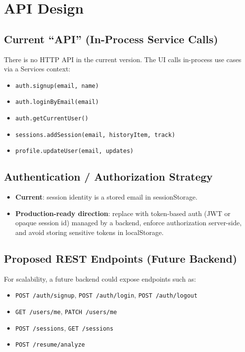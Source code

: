 \documentclass[11pt]{article}
\begin{document}
\section{API Design}

\subsection{Current ``API'' (In-Process Service Calls)}
There is no HTTP API in the current version. The UI calls in-process use cases via a Services context:
\begin{itemize}[leftmargin=1.2em]
  \item \texttt{auth.signup(email, name)}
  \item \texttt{auth.loginByEmail(email)}
  \item \texttt{auth.getCurrentUser()}
  \item \texttt{sessions.addSession(email, historyItem, track)}
  \item \texttt{profile.updateUser(email, updates)}
\end{itemize}

\subsection{Authentication / Authorization Strategy}
\begin{itemize}[leftmargin=1.2em]
  \item \textbf{Current}: session identity is a stored email in sessionStorage.
  \item \textbf{Production-ready direction}: replace with token-based auth (JWT or opaque session id) managed by a backend, enforce authorization server-side, and avoid storing sensitive tokens in localStorage.
\end{itemize}

\subsection{Proposed REST Endpoints (Future Backend)}
For scalability, a future backend could expose endpoints such as:
\begin{itemize}[leftmargin=1.2em]
  \item \texttt{POST /auth/signup}, \texttt{POST /auth/login}, \texttt{POST /auth/logout}
  \item \texttt{GET /users/me}, \texttt{PATCH /users/me}
  \item \texttt{POST /sessions}, \texttt{GET /sessions}
  \item \texttt{POST /resume/analyze}
\end{itemize}
\end{document}
